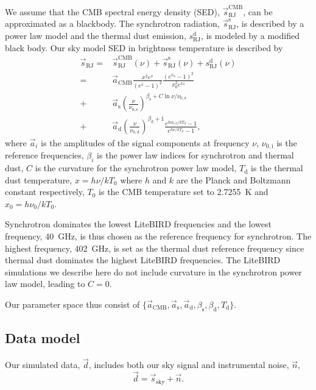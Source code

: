 \documentclass[twocolumn]{aa}
\renewcommand{\d}[0]{\vec{d}}
\newcommand{\n}[0]{\vec{n}}
\newcommand{\s}[0]{\vec{s}}
\renewcommand{\a}[0]{\vec{a}}
\begin{document}
We assume that the CMB spectral energy density (SED), $\s_{\mathrm{RJ}}^{\mathrm{CMB}}$, can be approximated as a blackbody. The synchrotron radiation, $\s_{\mathrm{RJ}}^{\mathrm{s}}$, is described by a power law model and the thermal dust emission, $s^{\mathrm{d}}_{\mathrm{RJ}}$, is modeled by a modified black body.  Our sky model SED in brightness temperature is  described by
%
\begin{align}
	\s_{\mathrm{RJ}} = & \s_{\mathrm{RJ}}^{\mathrm{CMB}}(\nu)  + \s_{\mathrm{RJ}}^{\mathrm{s}}(\nu) + 
	s^{\mathrm{d}}_{\mathrm{RJ}}(\nu) \\
	= & \a_{\mathrm{CMB}} \frac{x^2e^x}{(e^x-1)^2} \frac{(e^{x_0}-1)^2}{x_0^2 e^{x_0}} \\
	+ &   \a_{\mathrm{s}}\left(\frac{\nu}{\nu_{0,\mathrm{s}}} \right)^{\beta_{\mathrm{s}} + C\ln \nu/\nu_{0,\mathrm{s}}} \\
	+ & \a_{\mathrm{d}} \left( \frac{\nu}{\nu_{0,\mathrm{d}}} \right)^{\beta_{\mathrm{d}}+1}
	\frac{e^{h\nu_{0,\mathrm{d}}/kT_{\mathrm{d}}}-1}{e^{h\nu/kT_{\mathrm{d}}}-1},
\end{align}
where $\a_i$ is the amplitudes of the signal components at frequency $\nu$, $\nu_{0,\mathrm{i}}$ is the reference frequencies, $\beta_i$ is the power law indices for synchrotron and thermal dust, $C$ is the curvature for the synchrotron power law model, $T_{\mathrm{d}}$ is the thermal dust temperature, $x=h\nu/kT_0$ where $h$ and $k$ are the Planck and Boltzmann constant respectively, $T_0$ is the CMB temperature set to 2.7255~K and $x_0=h\nu_0/kT_0$.

Synchrotron dominates the lowest LiteBIRD frequencies and the lowest frequency, 40~GHz, is thus chosen as the reference frequency for synchrotron. The highest frequency, 402~GHz, is set as the thermal dust reference frequency since thermal dust dominates the highest LiteBIRD frequencies. The LiteBIRD simulations we describe here do not include curvature in the synchrotron power law model, leading to $C=0$.

Our parameter space thus consist of $\{\a_{\mathrm{CMB}}, \a_{\mathrm{s}}, \a_{\mathrm{d}}, \beta_{\mathrm{s}}, \beta_{\mathrm{d}}, T_{\mathrm{d}}\}$.



\subsection{Data model}
Our simulated data, $\d$, includes both our sky signal and instrumental noise, $\n$,  %
\begin{equation}
\d = \s_{\mathrm{sky}} + \n.
\end{equation}
\end{document}
